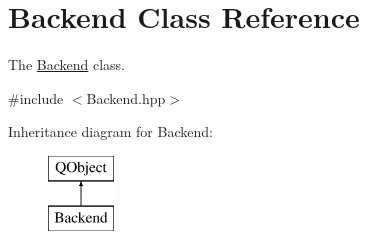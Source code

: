 \hypertarget{classBackend}{\section{Backend Class Reference}
\label{classBackend}
}


The \hyperlink{classBackend}{Backend} class.  




{\ttfamily \#include $<$Backend.\+hpp$>$}

Inheritance diagram for Backend\+:\begin{figure}[H]
\begin{center}
\leavevmode
\includegraphics[height=2.000000cm]{classBackend}
\end{center}
\end{figure}
